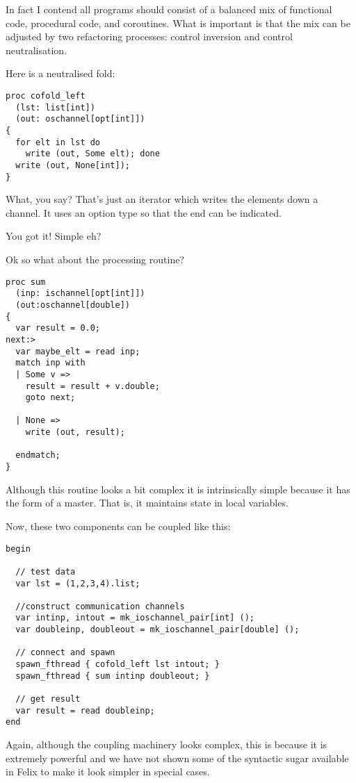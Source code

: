 \documentclass{article}
\begin{document}
In fact I contend all programs should consist of a balanced mix of 
functional code, procedural code, and coroutines. What is important
is that the mix can be adjusted by two refactoring processes:
control inversion and control neutralisation.

Here is a neutralised fold:

\begin{verbatim}
proc cofold_left 
  (lst: list[int])
  (out: oschannel[opt[int]])
{
  for elt in lst do 
    write (out, Some elt); done
  write (out, None[int]);
}
\end{verbatim}

What, you say? That's just an iterator which writes
the elements down a channel. It uses an option type
so that the end can be indicated.

You got it! Simple eh?

Ok so what about the processing routine?

\begin{verbatim}
proc sum 
  (inp: ischannel[opt[int]])
  (out:oschannel[double]) 
{
  var result = 0.0;
next:>
  var maybe_elt = read inp;
  match inp with
  | Some v =>
    result = result + v.double;
    goto next;

  | None => 
    write (out, result);

  endmatch;
}
\end{verbatim}

Although this routine looks a bit complex it is intrinsically simple
because it has the form of a master. That is, it maintains state
in local variables.

Now, these two components can be coupled like this:

\begin{verbatim}
begin

  // test data
  var lst = (1,2,3,4).list;

  //construct communication channels
  var intinp, intout = mk_ioschannel_pair[int] ();
  var doubleinp, doubleout = mk_ioschannel_pair[double] ();

  // connect and spawn
  spawn_fthread { cofold_left lst intout; }
  spawn_fthread { sum intinp doubleout; }
  
  // get result
  var result = read doubleinp;
end
\end{verbatim}

Again, although the coupling machinery looks complex, this is because
it is extremely powerful and we have not shown some of the syntactic
sugar available in Felix to make it look simpler in special cases.
\end{document}

